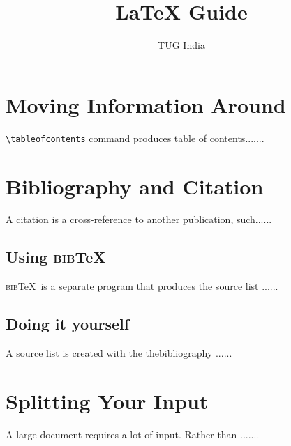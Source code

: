 \documentclass{article}
\def\bibTeX{\textsc{bib}\TeX}
\begin{document}
\title{\LaTeX{} Guide}
\author{TUG India}
\date{}
\maketitle
\tableofcontents
{}
\section{Moving Information Around}

\vspace{24pt}

\verb+\tableofcontents+ command produces table of contents.......
\section{Bibliography and Citation}
A citation is a cross-reference to another publication, such......
\subsection{Using \bibTeX}
\bibTeX\ is a separate program that produces the source list ......
\subsection{Doing it yourself}
A source list is created with the thebibliography ......
\section*{Splitting Your Input}
A large document requires a lot of input. Rather than .......
\end{document}
